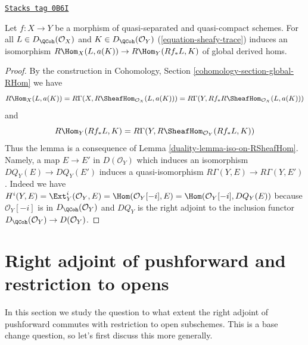 \begin{lemma}
\label{duality-lemma-iso-global-hom}
\href{https://stacks.math.columbia.edu/tag/0B6I}{\texttt{Stacks tag 0B6I}}

Let $f : X \to Y$ be a morphism of quasi-separated and quasi-compact
schemes.
For all $L \in D_\QCoh(\mathcal{O}_X)$ and $K \in D_\QCoh(\mathcal{O}_Y)$
(\ref{equation-sheafy-trace}) induces an isomorphism
$R\Hom_X(L, a(K)) \to R\Hom_Y(Rf_*L, K)$ of global derived homs.
\end{lemma}

\begin{proof}

By the construction in
Cohomology, Section \ref{cohomology-section-global-RHom}
we have
$$
R\Hom_X(L, a(K)) =
R\Gamma(X, R\SheafHom_{\mathcal{O}_X}(L, a(K))) =
R\Gamma(Y, Rf_*R\SheafHom_{\mathcal{O}_X}(L, a(K)))
$$
and
$$
R\Hom_Y(Rf_*L, K) = R\Gamma(Y, R\SheafHom_{\mathcal{O}_Y}(Rf_*L, K))
$$
Thus the lemma is a consequence of Lemma \ref{duality-lemma-iso-on-RSheafHom}.
Namely, a map $E \to E'$ in $D(\mathcal{O}_Y)$ which induces
an isomorphism $DQ_Y(E) \to DQ_Y(E')$ induces a quasi-isomorphism
$R\Gamma(Y, E) \to R\Gamma(Y, E')$. Indeed we have
$H^i(Y, E) = \Ext^i_Y(\mathcal{O}_Y, E) = \Hom(\mathcal{O}_Y[-i], E) =
\Hom(\mathcal{O}_Y[-i], DQ_Y(E))$ because $\mathcal{O}_Y[-i]$
is in $D_\QCoh(\mathcal{O}_Y)$ and $DQ_Y$ is the right adjoint
to the inclusion functor $D_\QCoh(\mathcal{O}_Y) \to D(\mathcal{O}_Y)$.
\end{proof}

\section{Right adjoint of pushforward and restriction to opens}
\label{duality-section-restriction-to-opens}
In this section we study the question to what extent the right adjoint
of pushforward commutes with restriction to open subschemes. This is
a base change question, so let's first discuss this more generally.

